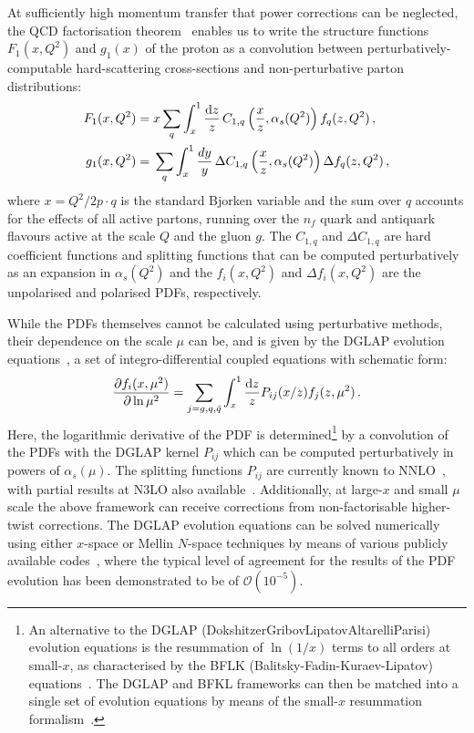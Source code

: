 At sufficiently high momentum transfer that power corrections can be neglected,
the QCD factorisation theorem~\cite{Sterman:1995fz}
enables us to write the structure functions $F_1(x,Q^2)$ and $g_1(x)$ of the proton as
a convolution between perturbatively-computable hard-scattering cross-sections
and non-perturbative parton distributions:
\begin{align}
F_1(x,Q^2) = {} & x\sum_q \int_x^1 \frac{{\rm d}z}{z}\,C_{1,q}\left(\frac{x}{z},\alpha_s(Q^2)\right)f_q(z,Q^2) \,, \label{eq:Fi}\\
g_1(x,Q^2) = {} & \sum_q \int_x^1\frac{dy}{y}\, \Delta C_{1,q}\left(\frac{x}{z},\alpha_s(Q^2)\right) \Delta f_q(z,Q^2) \,,
\label{pdf}
\end{align}
where $x=Q^2/2p\cdot q$ is the standard Bjorken variable and the sum over $q$
accounts for the effects of all active partons,
running over  the $n_f$ quark and antiquark flavours active
at the scale $Q$ and the gluon $g$.
%
The $C_{1,q}$ and $\Delta C_{1,q}$ are hard coefficient functions and splitting functions that can be computed perturbatively as an expansion in $\alpha_s(Q^2)$ and the $f_i(x,Q^2)$ and $\Delta f_i(x,Q^2)$ are the unpolarised and polarised PDFs, respectively.

While the PDFs themselves cannot be calculated using perturbative methods, their dependence on the scale $\mu$ can be, and is given by the  
DGLAP evolution equations~\cite{Dokshitzer:1977sg,Gribov:1972ri,Altarelli:1977zs},
a set of integro-differential coupled equations with schematic form:
\begin{equation}
  \label{eq:dglap}
\frac{\partial f_i(x,\mu^2)}{\partial \ln \mu^2}=\sum_{j=g,q,\bar{q}}\int_x^1 \frac{{\rm d}z}{z}P_{ij}(x/z)f_j(z,\mu^2)\, .
\end{equation}
Here, the logarithmic derivative of the PDF is
determined\footnote{An alternative
to the DGLAP (Dokshitzer\textendash Gribov\textendash Lipatov\textendash Altarelli\textendash Parisi) 
evolution equations is the resummation of $\ln(1/x)$ terms to all
orders at small-$x$, as characterised by the BFLK (Balitsky-Fadin-Kuraev-Lipatov) equations~\cite{Kuraev:1976ge,Kuraev:1977fs,Balitsky:1978ic}.
%
The DGLAP and BFKL frameworks can then be matched into a single set of evolution equations
by means of the small-$x$ resummation
formalism~\cite{White:2006yh,Altarelli:2008aj,Ciafaloni:2007gf,Bonvini:2016wki}.} by a convolution
of the PDFs with the DGLAP kernel $P_{ij}$ which can be computed
perturbatively in powers of $\alpha_{s}(\mu)$.
%
The splitting functions $P_{ij}$ are currently known to NNLO~\cite{mvvns,Vogt:2004mw}, with partial
results at N3LO also available~\cite{Moch:2017uml}.
%
Additionally, at large-$x$ and small $\mu$ scale the above framework
can receive corrections from non-factorisable higher-twist corrections.
%
The DGLAP evolution equations can be solved numerically using
either $x$-space or Mellin $N$-space techniques by means of various
publicly available
codes~\cite{Bertone:2013vaa,Salam:2008qg,Botje:2010ay}, where the typical level of agreement
for the results of the PDF evolution has been
demonstrated to be of $\mathcal{O}(10^{-5})$.

